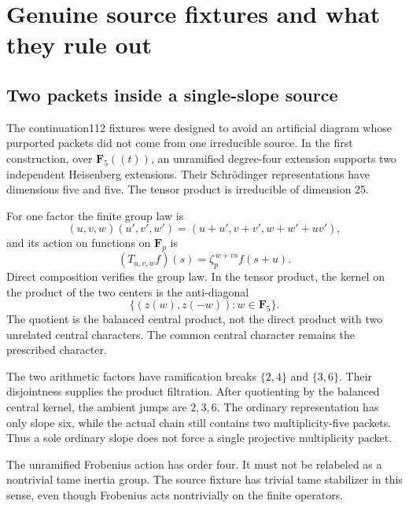 \documentclass[11pt]{article}
\theoremstyle{definition}\newtheorem{definition}[proposition]{Definition}
\newcommand{\F}{\mathbf F}
\begin{document}
\section{Genuine source fixtures and what they rule out}\label{sec:fixtures}
\subsection{Two packets inside a single-slope source}
The continuation112 fixtures were designed to avoid an artificial diagram whose purported packets did not come from one irreducible source. In the first construction, over $\F_5((t))$, an unramified degree-four extension supports two independent Heisenberg extensions. Their Schr\"odinger representations have dimensions five and five. The tensor product is irreducible of dimension 25.

For one factor the finite group law is
\[
 (u,v,w)(u',v',w')=(u+u',v+v',w+w'+uv'),
\]
and its action on functions on $\F_p$ is
\[
 (T_{u,v,w}f)(s)=\zeta_p^{\,w+vs}f(s+u).
 \tag{16.1}\label{eq:weyl}
\]
Direct composition verifies the group law. In the tensor product, the kernel on the product of the two centers is the anti-diagonal
\[
 \{(z(w),z(-w)):w\in\F_5\}.
\]
The quotient is the balanced central product, not the direct product with two unrelated central characters. The common central character remains the prescribed character.

The two arithmetic factors have ramification breaks $\{2,4\}$ and $\{3,6\}$. Their disjointness supplies the product filtration. After quotienting by the balanced central kernel, the ambient jumps are $2,3,6$. The ordinary representation has only slope six, while the actual chain still contains two multiplicity-five packets. Thus a sole ordinary slope does not force a single projective multiplicity packet.

The unramified Frobenius action has order four. It must not be relabeled as a nontrivial tame inertia group. The source fixture has trivial tame stabilizer in this sense, even though Frobenius acts nontrivially on the finite operators.
\end{document}

